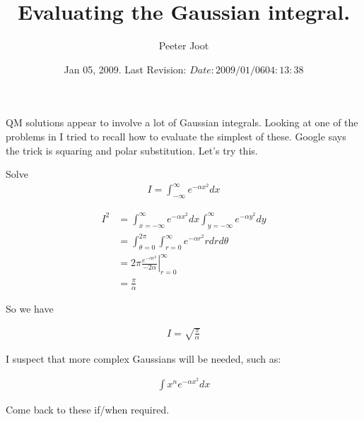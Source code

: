 \documentclass{article}
\title{ Evaluating the Gaussian integral. }
\author{Peeter Joot}
\date{ Jan 05, 2009.  Last Revision: $Date: 2009/01/06 04:13:38 $ }
\begin{document}
\maketitle{}

QM solutions appear to involve a lot of Gaussian integrals.  Looking at one
of the problems in \cite{mcmahon2005qmd} I tried to recall how to evaluate
the simplest of these.  Google says the trick is squaring and polar 
substitution.  Let's try this.

Solve
\begin{align*}
I = \int_{-\infty}^\infty e^{-\alpha x^2} dx
\end{align*}

\begin{align*}
I^2 
&= \int_{x= -\infty}^\infty e^{-\alpha x^2} dx \int_{y = -\infty}^\infty e^{-\alpha y^2} dy \\
&= \int_{\theta=0}^{2\pi}\int_{r= 0}^\infty e^{-\alpha r^2} r dr d\theta \\
&= 2\pi 
{\left.
\frac{e^{-\alpha r^2}}{-2\alpha}
\right\vert}_{r= 0}^\infty  \\
&= \frac{\pi}{\alpha}
\end{align*}

So we have

\begin{align*}
I = \sqrt{\frac{\pi}{\alpha}}
\end{align*}

I suspect that more complex Gaussians will be needed, such as:

\begin{align*}
\int x^n e^{-\alpha x^2} dx
\end{align*}

Come back to these if/when required.



\end{document}

